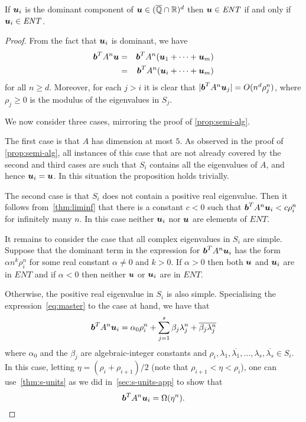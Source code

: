 \begin{proposition}
  If $\boldsymbol{u}_i$ is the dominant component of $\boldsymbol{u}
  \in (\overline{\mathbb{Q}}\cap\mathbb{R})^{d}$ then $\boldsymbol{u}\in\mathit{ENT}$ if and only
if $\boldsymbol{u}_i \in \mathit{ENT}$.
\label{prop:dominant}
\end{proposition}
\begin{proof}
From the fact that $\boldsymbol{u}_i$ is dominant, we have
\begin{eqnarray}
 \myvector{b}^TA^n\myvector{u}&=&
   \myvector{b}^TA^n(\myvector{u}_1+\cdots+\myvector{u}_m) \notag\\
&=&\myvector{b}^TA^n(\myvector{u}_i+\cdots+\myvector{u}_m)
\label{eq:part}
\end{eqnarray}
for all $n\geq d$.  Moreover, for each $j>i$ it is clear that
  $|\boldsymbol{b}^TA^n\boldsymbol{u}_j| = O(n^{d}\rho_j^n)$, where
  $\rho_j\geq 0$ is the modulus of the eigenvalues in $S_j$.

  We now consider three cases, mirroring the proof of
  \cref{prop:semi-alg}.

  The first case is that $A$ has dimension at most $5$.  As observed
  in the proof of \cref{prop:semi-alg}, all instances of
  this case that are not already covered by the second and third cases
  are such that $S_i$ contains all the eigenvalues of $A$, and hence
  $\boldsymbol{u}_i=\boldsymbol{u}$.  In this situation the proposition
  holds trivially.

  The second case is that $S_i$ does not contain a positive real
  eigenvalue.  Then it follows from~\cref{thm:liminf} that there
  is a constant $c<0$ such that
  $\boldsymbol{b}^{T} A^{n} \boldsymbol{u}_{i} < c \rho_{i}^{n}$ for infinitely many $n$.  In this case neither $\boldsymbol{u}_i$ nor $\boldsymbol{u}$
  are elements of $\mathit{ENT}$.

  It remains to consider the case that all complex eigenvalues in
  $S_i$ are simple.  Suppose that the dominant term in the expression
  for $\boldsymbol{b}^TA^n\boldsymbol{u}_i$ has the form $\alpha
  n^k\rho_i^n$ for some real constant $\alpha\neq 0$ and $k>0$.  If
  $\alpha>0$ then both $\boldsymbol{u}$ and $\boldsymbol{u}_i$ are in
  $\mathit{ENT}$ and if $\alpha<0$ then neither $\boldsymbol{u}$ or
  $\boldsymbol{u}_i$ are in $\mathit{ENT}$.

  Otherwise, the positive real eigenvalue in $S_{i}$ is also simple. Specialising the expression~\eqref{eq:master} to the case
  at hand, we have that
\begin{gather}
\label{eq:diag}
 \myvector{b}^TA^n\myvector{u}_i = \alpha_0 \rho_i^n+\sum\limits_{j=1}^s\beta_j\lambda_j^n+\overline{\beta_j\lambda_j^n}
\end{gather}
where $\alpha_0$ and the $\beta_j$ are algebraic-integer constants and
$\rho_i,\lambda_1,\overline{\lambda_1},\ldots,\lambda_s,\overline{\lambda_s} \in S_i$.  In this case, letting $\eta = (\rho_{i} + \rho_{i+1})/2$ (note that $\rho_{i+1} < \eta < \rho_{i}$), one can use~\cref{thm:s-units} as we did in~\cref{sec:s-units-app} to show that
\begin{equation*}
  \boldsymbol{b}^{T} A^{n} \boldsymbol{u}_{i} = \Omega(\eta^{n}).
\end{equation*}


\end{proof}
